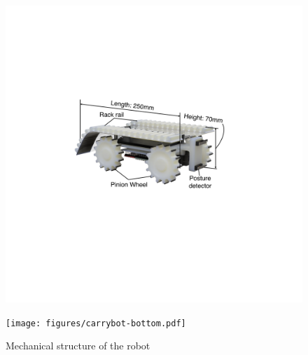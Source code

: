 \begin{figure}[tb]
  \begin{minipage}[b]{0.5\columnwidth}
  \centering
  \includegraphics[width=0.9\columnwidth]{figures/carrybot-diagonal.pdf}
  \label{fig:diagonal}
 \end{minipage}%
 \begin{minipage}[b]{0.5\columnwidth}
  \centering
  \texttt{[image: figures/carrybot-bottom.pdf]}
  \label{fig:bottom}
 \end{minipage}
 \caption{Mechanical structure of the robot}
 \label{fig:carrybot}
\end{figure}
